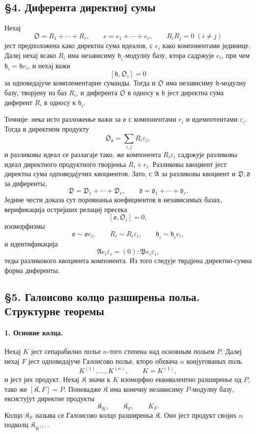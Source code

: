 ﻿\documentclass[11pt]{article}
\begin{document}
\subsection*{§4. Диферента директној сумы}

Нехај
\[
        \mathfrak O=R_1+\cdots+R_r,
        \qquad
        e=e_1+\cdots+e_r,
        \qquad R_iR_j=0\;(i\ne j)
\]
јест предположена како директна сума идеалов, с \(e_i\) како компонентами јединице. Далеј нехај всако \(R_i\) има независиму \(\mathfrak h_i\)-модулну базу, ктора садржује \(e_i\), при чем \(\mathfrak h_i=\mathfrak h e_i\), и нехај важи
\[
        [\mathfrak h,\mathfrak O_i]=0
\]
за одповедајуче комплементарне суманды. Тогда и \(\mathfrak O\) има независиму \(\mathfrak h\)-модулну базу, творјену из баз \(R_i\), и диферента \(\mathfrak O\) в односу к \(\mathfrak h\) јест директна сума диферент \(R_i\) в односу к \(\mathfrak h_i\).

Точније: нека исто разложенье важи за \(\mathfrak o\) с компонентами \(r_i\) и идемпотентами \(\varepsilon_i\). Тогда в директном продукту
\[
        \mathfrak O_{\mathfrak o}=\sum_{i,j} R_i\varepsilon_j,
\]
и разликовы идеал се разлагаје тако, же компонента \(R_i\varepsilon_i\) садржује разликовы идеал директного продуктного творјеньа \(R_i\times r_i\). Разликовы квоциент јест директна сума одповедајучих квоциентов. Зато, с \(\mathfrak A\) за разликовы квоциент и \(\mathfrak D,\mathfrak d\) за диференты,
\[
        \mathfrak D=\mathfrak D_1+\cdots+\mathfrak D_r,
        \qquad
        \mathfrak d=\mathfrak d_1+
        \cdots+\mathfrak d_r.
\]
Једине чести доказа сут поровнаньа коефициентов в независимых базах, верификација острејших релациј пресека
\[
        [\mathfrak o,\mathfrak O_i]=0,
\]
изоморфизмы
\[
        \mathfrak o\sim\mathfrak o e_i,
        \qquad
        R_i\sim R_i\varepsilon_i,
        \qquad
        \mathfrak h_i\sim \mathfrak h_i e_i,
\]
и идентификација
\[
        \mathfrak A e_i\varepsilon_i=(0):\mathfrak B e_i\varepsilon_i,
\]
теды разликового квоциента компонента. Из того следује тврдјена директно-сумна форма диференты.

\subsection*{§5. Галоисово колцо разширеньа польа. Структурне теоремы}

\paragraph{1. Основне колца.}
Нехај \(K\) јест сепарабилно полье \(n\)-того степена над основным польем \(P\). Далеј нехај \(F\) јест одповедајуче Галоисово полье, кторо обхвача \(n\) конјугованых поль
\[
        K^{(1)},\ldots,K^{(n)},\qquad K=K^{(1)},
\]
и јест јих продукт. Нехај \(\mathfrak K\) значи к \(K\) изоморфно еквивалентно разширенье од \(P\), тако же \([\mathfrak K,F]=P\). Поневадже \(\mathfrak K\) има конечну независиму \(P\)-модулну базу, ексистујут директне продукты
\[
        \mathfrak K_K,
        \qquad \mathfrak K_F,
        \qquad K_F.
\]
Колцо \(\mathfrak K_F\) называ се Галоисово колцо разширеньа \(\mathfrak K\). Оно јест продукт својих \(n\) подколц \(\mathfrak K_{K^{(i)}}\).
\end{document}

